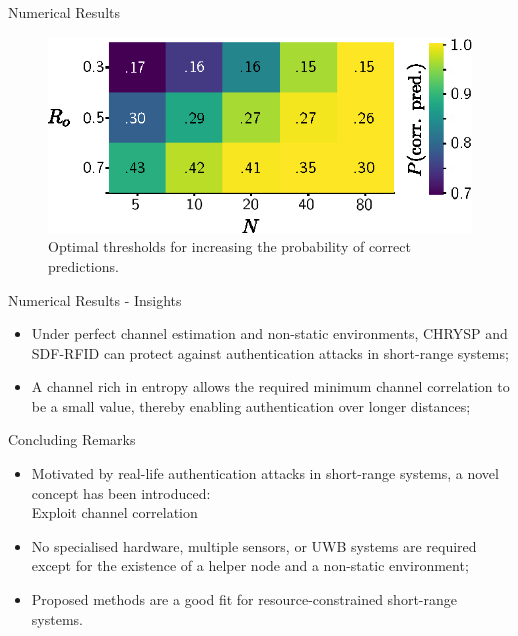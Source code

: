 \begin{frame}{Numerical Results}
\begin{figure}
    \centering
\includegraphics{figures/against_distance_fraud/colourmap_inkscape.eps}
\caption{Optimal thresholds for increasing the probability of correct predictions.}
\end{figure}
        
\end{frame}

\begin{frame}{Numerical Results - Insights}
\begin{itemize}

    \item Under perfect channel estimation and non-static environments, CHRYSP and SDF-RFID can protect against authentication attacks in short-range systems;
    \item A channel rich in entropy allows the required minimum channel correlation to be a small value, thereby enabling authentication over longer distances;
    

\end{itemize}

\end{frame}

\begin{frame}{Concluding Remarks}
\begin{itemize}

    \item Motivated by real-life authentication attacks in short-range systems, a novel concept has been introduced:\\
    Exploit channel correlation
    \item No specialised hardware, multiple sensors, or UWB systems are required except for the existence of a helper node and a non-static environment;
    \item Proposed methods are a good fit for resource-constrained short-range systems.
    

\end{itemize}

\end{frame}


